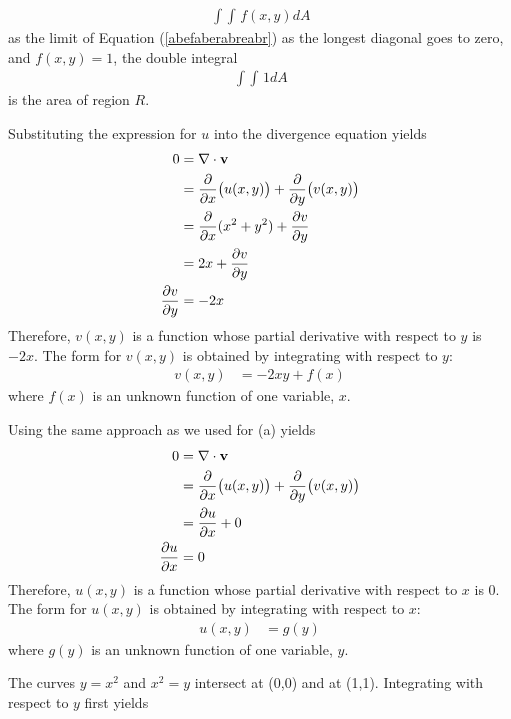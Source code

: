 \documentclass{article}
\begin{document}
\begin{align*}
  \mathop{\int \!\!\! \int} f(x,y) dA
\end{align*}
as the limit of Equation (\ref{abefaberabreabr}) as the longest diagonal goes to zero, and $f(x,y)=1$, the double integral 
\begin{align*}
  \mathop{\int \!\!\! \int} 1 dA
\end{align*}
is the area of region $R$. 
\item
\BEN
\item Substituting the expression for $u$ into the divergence equation yields
\begin{align*}
  0&= \nabla \cdot \mathbf{v} \\
  &= \frac{\partial}{\partial x} \big(u(x,y)\big) + \frac{\partial}{\partial y} \big(v(x,y)\big) \\
  &= \frac{\partial}{\partial x} (x^2 + y^2) + \frac{\partial v}{\partial y}\\
  &= 2x + \frac{\partial v}{\partial y} \\
   \frac{\partial v}{\partial y} &= -2x 
\end{align*}
Therefore, $v(x,y)$ is a function whose partial derivative with respect to $y$ is $-2x$. The  form for $v(x,y)$ is obtained by integrating with respect to $y$:
\begin{align*}
 v(x,y) &= -2xy + f(x)
\end{align*}
where $f(x)$ is an unknown function of one variable, $x$. 
\item Using the same approach as we used for (a) yields
\begin{align*}
  0&= \nabla \cdot \mathbf{v} \\
  &= \frac{\partial}{\partial x} \big(u(x,y)\big) + \frac{\partial}{\partial y} \big(v(x,y)\big) \\
  &=  \frac{\partial u}{\partial x}+ 0\\
   \frac{\partial u}{\partial x} &= 0
\end{align*}
Therefore, $u(x,y)$ is a function whose partial derivative with respect to $x$ is $0$. The  form for $u(x,y)$ is obtained by integrating with respect to $x$:
\begin{align*}
 u(x,y) &= g(y)
\end{align*}
where $g(y)$ is an unknown function of one variable, $y$. 
\EEN
\item %
The curves $y=x^2$ and $x^2=y$ intersect at (0,0) and at (1,1). Integrating with respect to $y$ first yields
\end{document}
